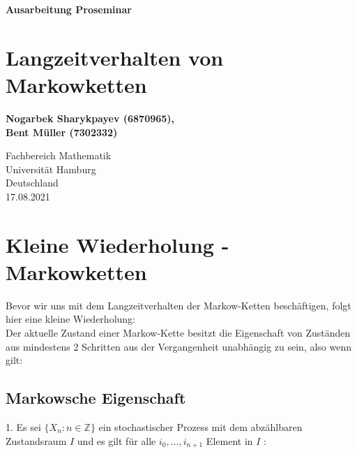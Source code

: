 \documentclass[a4paper]{article}
\begin{document}
\begin{titlepage}
   \begin{center}
       \vspace*{1cm}

       \textbf{Ausarbeitung Proseminar}

       \vspace{0.5cm}
	   \section*{
		   Langzeitverhalten von Markowketten
	   }
            
       \vspace{1.5cm}

	   \textbf{Nogarbek Sharykpayev (6870965),\\ Bent Müller (7302332)}

       \vfill
            
       \vspace{0.8cm}
     
            
       Fachbereich Mathematik\\
       Universität Hamburg\\
       Deutschland\\
       17.08.2021
            
   \end{center}
\end{titlepage}

\pagebreak
\tableofcontents
\pagebreak

\section{Kleine Wiederholung - Markowketten}

Bevor wir uns mit dem Langzeitverhalten der Markow-Ketten beschäftigen, folgt hier eine kleine Wiederholung:
\\

Der aktuelle Zustand einer Markow-Kette besitzt die Eigenschaft von Zuständen aus mindestens 2 Schritten aus der Vergangenheit unabhängig zu sein, also wenn gilt:

\subsection{Markowsche Eigenschaft}

1. Es sei $\{X_n : n \in \mathbb{Z} \}$ ein stochastischer Prozess mit dem abzählbaren Zustandsraum $I$ und es gilt für alle $i_0, …, i_{n+1}$ Element in $I$ : 
\end{document}
